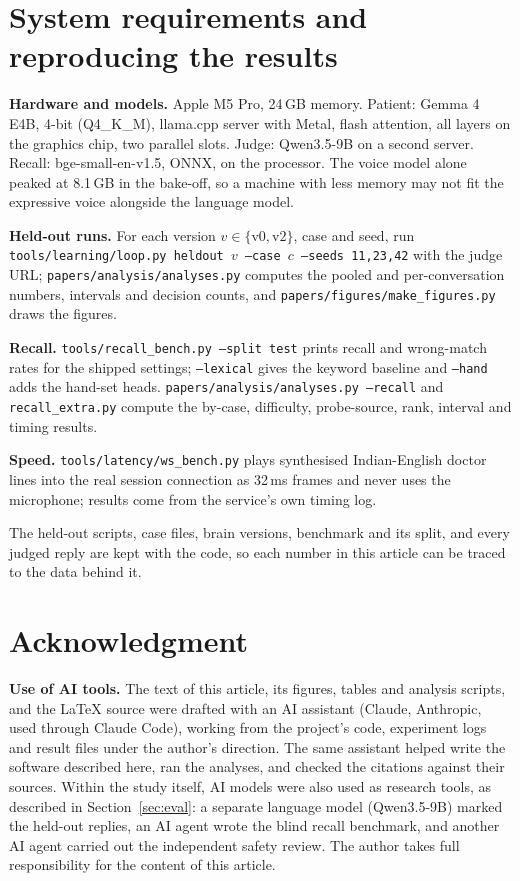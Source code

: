 \documentclass[journal]{IEEEtran}
\begin{document}
\section{System requirements and reproducing the results}
\textbf{Hardware and models.} Apple M5 Pro, 24\,GB memory. Patient: Gemma 4 E4B, 4-bit (Q4\_K\_M), llama.cpp server with Metal, flash
attention, all layers on the graphics chip, two parallel slots. Judge: Qwen3.5-9B on a second server. Recall: bge-small-en-v1.5, ONNX, on the
processor. The voice model alone peaked at 8.1\,GB in the bake-off, so a machine with less memory may not fit the expressive voice alongside the
language model.

\textbf{Held-out runs.} For each version $v\in\{\text{v0},\text{v2}\}$, case and seed, run
\texttt{tools/learning/loop.py heldout $v$ --case $c$ --seeds 11,23,42} with the judge URL; \texttt{papers/analysis/analyses.py} computes the
pooled and per-conversation numbers, intervals and decision counts, and \texttt{papers/figures/make\_figures.py} draws the figures.

\textbf{Recall.} \texttt{tools/recall\_bench.py --split test} prints recall and wrong-match rates for the shipped settings; \texttt{--lexical}
gives the keyword baseline and \texttt{--hand} adds the hand-set heads. \texttt{papers/analysis/analyses.py --recall} and
\texttt{recall\_extra.py} compute the by-case, difficulty, probe-source, rank, interval and timing results.

\textbf{Speed.} \texttt{tools/latency/ws\_bench.py} plays synthesised Indian-English doctor lines into the real session connection as 32\,ms
frames and never uses the microphone; results come from the service's own timing log.

The held-out scripts, case files, brain versions, benchmark and its split, and every judged reply are kept with the code, so each number in this
article can be traced to the data behind it.

\section*{Acknowledgment}
\textbf{Use of AI tools.} The text of this article, its figures, tables and analysis scripts, and the \LaTeX{} source were drafted with an AI
assistant (Claude, Anthropic, used through Claude Code), working from the project's code, experiment logs and result files under the author's
direction. The same assistant helped write the software described here, ran the analyses, and checked the citations against their sources.
Within the study itself, AI models were also used as research tools, as described in Section~\ref{sec:eval}: a separate language model
(Qwen3.5-9B) marked the held-out replies, an AI agent wrote the blind recall benchmark, and another AI agent carried out the independent safety
review. The author takes full responsibility for the content of this article.



\end{document}
